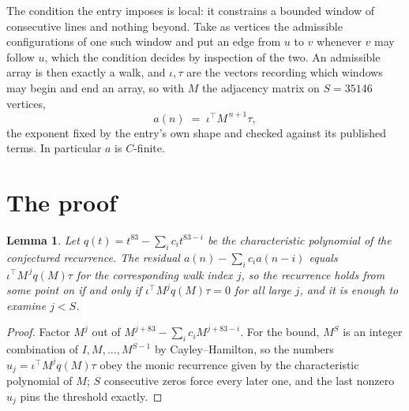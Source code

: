 \documentclass[11pt,a4paper]{article}
\theoremstyle{plain}
\newtheorem{lemma}[theorem]{Lemma}
\theoremstyle{definition}
\begin{document}
The condition the entry imposes is local: it constrains a bounded window of consecutive lines and nothing beyond. Take as vertices the admissible configurations of one such window and put an edge from $u$ to $v$ whenever $v$ may follow $u$, which the condition decides by inspection of the two.
An admissible array is then exactly a walk, and $\iota,\tau$ are the vectors recording which windows may begin and end an array, so with $M$ the adjacency matrix on $S=35146$ vertices,
\[
a(n)\;=\;\iota^{\!\top}M^{\,n+1}\tau ,
\]
the exponent fixed by the entry's own shape and checked against its published terms. In
particular $a$ is $C$-finite.

\section{The proof}

\begin{lemma}\label{lem:crit}
Let $q(t)=t^{83}-\sum_i c_it^{83-i}$ be the characteristic polynomial of the
conjectured recurrence. The residual $a(n)-\sum_ic_ia(n-i)$ equals
$\iota^{\!\top}M^{\,j}q(M)\tau$ for the corresponding walk index $j$, so the recurrence
holds from some point on if and only if $\iota^{\!\top}M^{j}q(M)\tau=0$ for all large $j$,
and it is enough to examine $j<S$.
\end{lemma}

\begin{proof}
Factor $M^{j}$ out of $M^{j+83}-\sum_ic_iM^{j+83-i}$. For the bound, $M^{S}$
is an integer combination of $I,M,\dots,M^{S-1}$ by Cayley--Hamilton, so the numbers
$u_j=\iota^{\!\top}M^{j}q(M)\tau$ obey the monic recurrence given by the characteristic
polynomial of $M$; $S$ consecutive zeros force every later one, and the last nonzero $u_j$
pins the threshold exactly.
\end{proof}
\end{document}

